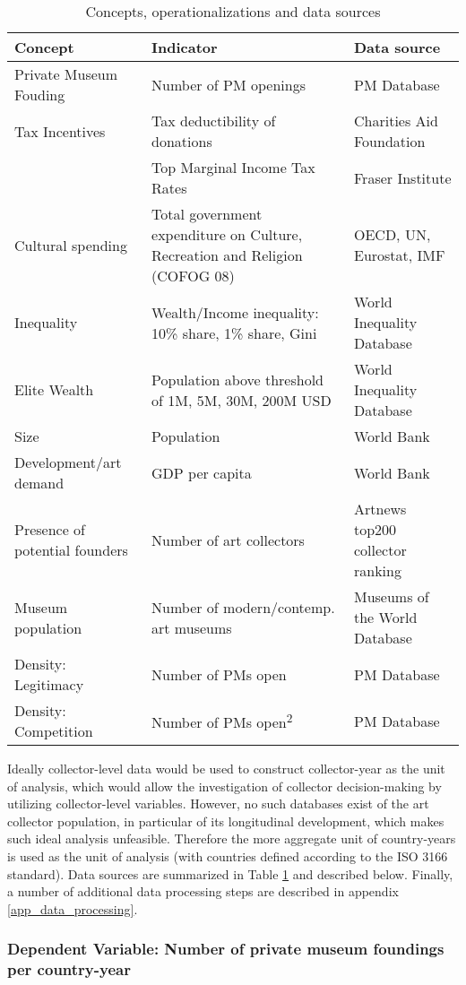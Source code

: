 \documentclass[11pt]{article}
\begin{document}
\begin{table}[htbp]
\caption{\label{tbl:data_srcs}Concepts, operationalizations and data sources}
\centering
\begin{tabular}{lp{7cm}l}
\hline
Concept & Indicator & Data source\\
\hline
Private Museum Fouding & Number of PM openings & PM Database\\
Tax Incentives & Tax deductibility of donations & Charities Aid Foundation\\
 & Top Marginal Income Tax Rates & Fraser Institute\\
Cultural spending & Total government expenditure on Culture, Recreation and Religion (COFOG 08) & OECD, UN, Eurostat, IMF\\
Inequality & Wealth/Income inequality: 10\% share, 1\% share, Gini & World Inequality Database\\
Elite Wealth & Population above threshold of 1M, 5M, 30M, 200M USD & World Inequality Database\\
Size & Population & World Bank\\
Development/art demand & GDP per capita & World Bank\\
Presence of potential founders & Number of art collectors & Artnews top200 collector ranking\\
Museum population & Number of modern/contemp. art museums & Museums of the World Database\\
Density: Legitimacy & Number of PMs open & PM Database\\
Density: Competition & Number of PMs open\textsuperscript{2} & PM Database\\
\hline
\end{tabular}
\end{table}


Ideally collector-level data would be used to construct collector-year as the unit of analysis, which would allow the investigation of collector decision-making by utilizing collector-level variables. 
However, no such databases exist of the art collector population, in particular of its longitudinal development, which makes such ideal analysis unfeasible. 
Therefore the more aggregate unit of country-years is used as the unit of analysis (with countries defined according to the ISO 3166 standard). 
Data sources are summarized in Table \ref{tbl:data_srcs} and described below.
Finally, a number of additional data processing steps are described in appendix \ref{app_data_processing}.


\subsubsection*{Dependent Variable: Number of private museum foundings per country-year}
\end{document}
